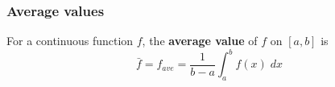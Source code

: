 



\begin{frame}
\frametitle{Average values}

\begin{definition}
For a continuous function $f$, the \textbf{average value } of $f$ on $[a,b]$ is \[\bar{f}= f_{ave}=\dfrac{1}{b-a}\int_a^b f(x)\;dx\]
\end{definition}


\end{frame}


